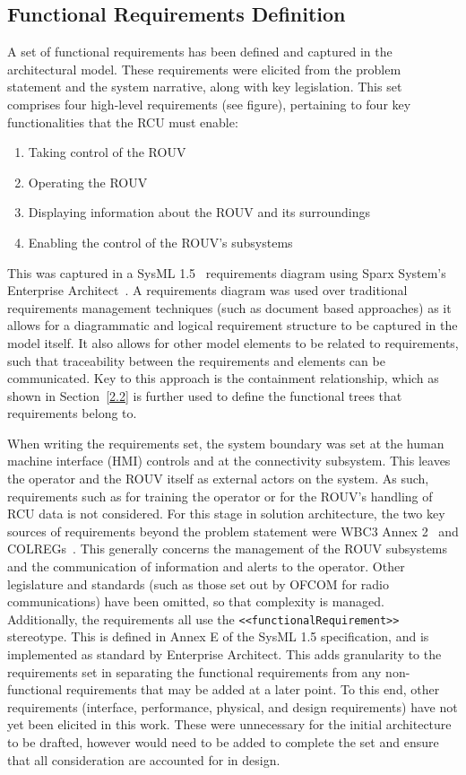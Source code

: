 \documentclass[../main.tex]{subfiles}
\begin{document}
\subsection{Functional Requirements Definition}\label{2.1}

A set of functional requirements has been defined and captured in the architectural model.
These requirements were elicited from the problem statement and the system narrative, along with key legislation.
This set comprises four high-level requirements (see figure), pertaining to four key functionalities that the RCU must enable:
\begin{enumerate}
    \item Taking control of the ROUV
    \item Operating the ROUV
    \item Displaying information about the ROUV and its surroundings
    \item Enabling the control of the ROUV's subsystems
\end{enumerate}

This was captured in a SysML 1.5~\cite{ObjectManagementGroup2017} requirements diagram using Sparx System's Enterprise Architect~\cite{SparxSystems2026}.
A requirements diagram was used over traditional requirements management techniques (such as document based approaches) as it allows for a diagrammatic and logical requirement structure to be captured in the model itself.
It also allows for other model elements to be related to requirements, such that traceability between the requirements and elements can be communicated.
Key to this approach is the containment relationship, which as shown in Section~\ref{2.2} is further used to define the functional trees that requirements belong to.

When writing the requirements set, the system boundary was set at the human machine interface (HMI) controls and at the connectivity subsystem.
This leaves the operator and the ROUV itself as external actors on the system.
As such, requirements such as for training the operator or for the ROUV's handling of RCU data is not considered.
For this stage in solution architecture, the two key sources of requirements beyond the problem statement were WBC3 Annex 2~\cite{WBC3} and COLREGs~\cite{COLREGS1972}.
This generally concerns the management of the ROUV subsystems and the communication of information and alerts to the operator.
Other legislature and standards (such as those set out by OFCOM for radio communications) have been omitted, so that complexity is managed.
Additionally, the requirements all use the \texttt{<<functionalRequirement>>} stereotype.  
This is defined in Annex E of the SysML 1.5 specification, and is implemented as standard by Enterprise Architect.
This adds granularity to the requirements set in separating the functional requirements from any non-functional requirements that may be added at a later point.
To this end, other requirements (interface, performance, physical, and design requirements) have not yet been elicited in this work.
These were unnecessary for the initial architecture to be drafted, however would need to be added to complete the set and ensure that all consideration are accounted for in design.
\end{document}
